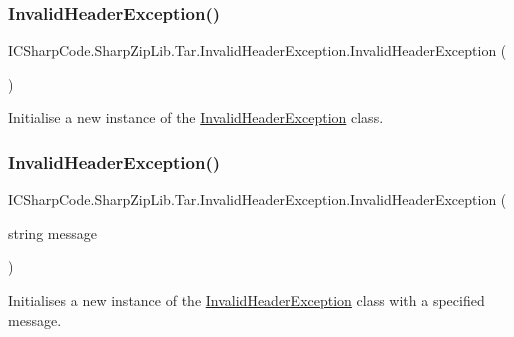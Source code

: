 \subsubsection{\texorpdfstring{Invalid\+Header\+Exception()}{InvalidHeaderException()}\hspace{0.1cm}{\footnotesize\ttfamily [2/4]}}
{\footnotesize\ttfamily I\+C\+Sharp\+Code.\+Sharp\+Zip\+Lib.\+Tar.\+Invalid\+Header\+Exception.\+Invalid\+Header\+Exception (\begin{DoxyParamCaption}{ }\end{DoxyParamCaption})\hspace{0.3cm}{\ttfamily [inline]}}



Initialise a new instance of the \hyperlink{class_i_c_sharp_code_1_1_sharp_zip_lib_1_1_tar_1_1_invalid_header_exception}{Invalid\+Header\+Exception} class. 

\mbox{\label{class_i_c_sharp_code_1_1_sharp_zip_lib_1_1_tar_1_1_invalid_header_exception_a71730ed35ff06c3cad1b48f42428515d}} 
\subsubsection{\texorpdfstring{Invalid\+Header\+Exception()}{InvalidHeaderException()}\hspace{0.1cm}{\footnotesize\ttfamily [3/4]}}
{\footnotesize\ttfamily I\+C\+Sharp\+Code.\+Sharp\+Zip\+Lib.\+Tar.\+Invalid\+Header\+Exception.\+Invalid\+Header\+Exception (\begin{DoxyParamCaption}\item[{string}]{message }\end{DoxyParamCaption})\hspace{0.3cm}{\ttfamily [inline]}}



Initialises a new instance of the \hyperlink{class_i_c_sharp_code_1_1_sharp_zip_lib_1_1_tar_1_1_invalid_header_exception}{Invalid\+Header\+Exception} class with a specified message. 


